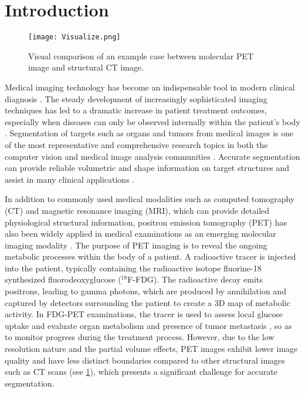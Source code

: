 \section{Introduction}
\label{sec:intro}

\begin{figure}[t]
	\texttt{[image: Visualize.png]}
	\caption{Visual comparison of an example case between molecular PET image and structural CT image.}
	\label{Visualize}
\end{figure}

Medical imaging technology has become an indispensable tool in modern clinical diagnosis \cite{kasban2015comparative,Lynch2018NewMT}. The steady development of increasingly sophisticated imaging techniques has led to a dramatic increase in patient treatment outcomes, especially when diseases can only be observed internally within the patient's body \cite{MIA2017survey}. 
Segmentation of targets such as organs and tumors from medical images is one of the most representative and comprehensive research topics in both the computer vision and medical image analysis communities \cite{hesamian2019deep}. 
Accurate segmentation can provide reliable volumetric and shape information on target structures and assist in many clinical applications \cite{lalande2021deep,AbdomenCT-1K,zhang2024nasalseg}.

In addition to commonly used medical modalities such as computed tomography (CT) and magnetic resonance imaging (MRI), which can provide detailed physiological structural information, positron emission tomography (PET) has also been widely applied in medical examinations as an emerging molecular imaging modality \cite{schwenck2023advances}.
The purpose of PET imaging is to reveal the ongoing metabolic processes within the body of a patient. A radioactive tracer is injected into the patient, typically containing the radioactive isotope fluorine-18 synthesized fluorodeoxyglucose ($^{18}$F-FDG). 
The radioactive decay emits positrons, leading to gamma photons, which are produced by annihilation and captured by detectors surrounding the patient to create a 3D map of metabolic activity.
In FDG-PET examinations, the tracer is used to assess local glucose uptake and evaluate organ metabolism \cite{ren2019atlas,wang2025robust} and presence of tumor metastasis \cite{AutoPET}, so as to monitor progress during the treatment process.
However, due to the low resolution nature and the partial volume effects, PET images exhibit lower image quality and have less distinct boundaries compared to other structural images such as CT scans (see \cref{Visualize}), which presents a significant challenge for accurate segmentation.




